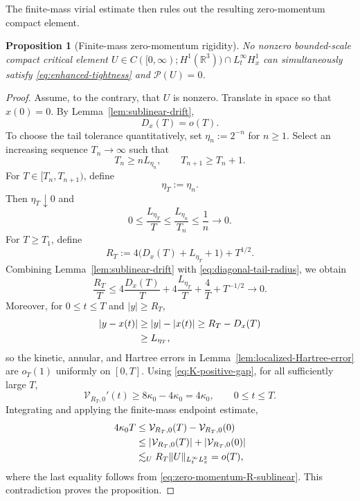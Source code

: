 \documentclass[preprint,12pt]{elsarticle}
\numberwithin{equation}{section}
\newtheorem{proposition}[theorem]{Proposition}
\theoremstyle{remark}
\newcommand{\R}{\mathbb R}
\newcommand{\Vcal}{\mathcal V}
\newcommand{\Pcal}{\mathcal P}
\begin{document}
The finite-mass virial estimate then rules out the resulting zero-momentum compact element.

\begin{proposition}[Finite-mass zero-momentum rigidity]\label{prop:zero-momentum-rigidity}
No nonzero bounded-scale compact critical element $U\in C([0,\infty);H^1(\R^3))\cap L_t^\infty H_x^1$ can simultaneously satisfy \eqref{eq:enhanced-tightness} and $\Pcal(U)=0$.
\end{proposition}

\begin{proof}
Assume, to the contrary, that $U$ is nonzero.  Translate in space so that $x(0)=0$.  By Lemma~\ref{lem:sublinear-drift},
\begin{equation*}
  D_x(T)=o(T).
\end{equation*}
To choose the tail tolerance quantitatively, set $\eta_n:=2^{-n}$ for $n\ge1$. Select an increasing sequence $T_n\to\infty$ such that
\begin{equation*}
  T_n\ge nL_{\eta_n},
  \qquad
  T_{n+1}\ge T_n+1.
\end{equation*}
For $T\in[T_n,T_{n+1})$, define
\begin{equation*}
  \eta_T:=\eta_n.
\end{equation*}
Then $\eta_T\downarrow0$ and
\begin{equation}\label{eq:diagonal-tail-radius}
  0\le\frac{L_{\eta_T}}{T}
  \le\frac{L_{\eta_n}}{T_n}
  \le\frac1n
  \longrightarrow0.
\end{equation}
For $T\ge T_1$, define
\begin{equation*}
  R_T:=4\bigl(D_x(T)+L_{\eta_T}+1\bigr)+T^{1/2}.
\end{equation*}
Combining Lemma~\ref{lem:sublinear-drift} with \eqref{eq:diagonal-tail-radius}, we obtain
\begin{equation}\label{eq:zero-momentum-R-sublinear}
  \frac{R_T}{T}
  \le4\frac{D_x(T)}T
  +4\frac{L_{\eta_T}}T
  +\frac4T+T^{-1/2}
  \longrightarrow0.
\end{equation}
Moreover, for $0\le t\le T$ and $|y|\ge R_T$,
\begin{align*}
  |y-x(t)|
  &\ge |y|-|x(t)|
  \ge R_T-D_x(T)\notag\\
  &\ge L_{\eta_T},
\end{align*}
so the kinetic, annular, and Hartree errors in Lemma~\ref{lem:localized-Hartree-error} are $o_T(1)$ uniformly on $[0,T]$.  Using \eqref{eq:K-positive-gap}, for all sufficiently large $T$,
\begin{equation*}
  \Vcal_{R_T,0}'(t)
  \ge8\kappa_0-4\kappa_0
  =4\kappa_0,
  \qquad 0\le t\le T.
\end{equation*}
Integrating and applying the finite-mass endpoint estimate,
\begin{align*}
  4\kappa_0T
  &\le\Vcal_{R_T,0}(T)-\Vcal_{R_T,0}(0)\notag\\
  &\le|\Vcal_{R_T,0}(T)|+|\Vcal_{R_T,0}(0)|\notag\\
  &\lesssim_U R_T\|U\|_{L_t^\infty L_x^2}
  =o(T),
\end{align*}
where the last equality follows from \eqref{eq:zero-momentum-R-sublinear}.  This contradiction proves the proposition.
\end{proof}
\end{document}
